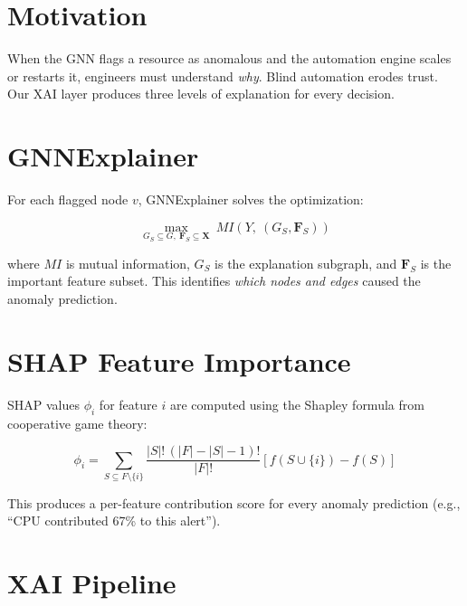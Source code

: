 \documentclass[12pt,a4paper]{report}
\begin{document}
\section{Motivation}

When the GNN flags a resource as anomalous and the automation engine
scales or restarts it, engineers must understand \emph{why}. Blind
automation erodes trust. Our XAI layer produces three levels of
explanation for every decision.

\section{GNNExplainer}

For each flagged node $v$, GNNExplainer solves the optimization:

\begin{equation}
\max_{G_S \subseteq G,\ \mathbf{F}_S \subseteq \mathbf{X}}
\  MI\!\left(Y,\ (G_S, \mathbf{F}_S)\right)
\end{equation}

where $MI$ is mutual information, $G_S$ is the explanation subgraph,
and $\mathbf{F}_S$ is the important feature subset. This identifies
\emph{which nodes and edges} caused the anomaly prediction.

\section{SHAP Feature Importance}

SHAP values $\phi_i$ for feature $i$ are computed using the
Shapley formula from cooperative game theory:

\begin{equation}
\phi_i = \sum_{S \subseteq F \setminus \{i\}}
\frac{|S|!\,(|F|-|S|-1)!}{|F|!}
\left[ f(S \cup \{i\}) - f(S) \right]
\end{equation}

This produces a per-feature contribution score for every anomaly
prediction (e.g., ``CPU contributed 67\% to this alert'').

\section{XAI Pipeline}
\end{document}
